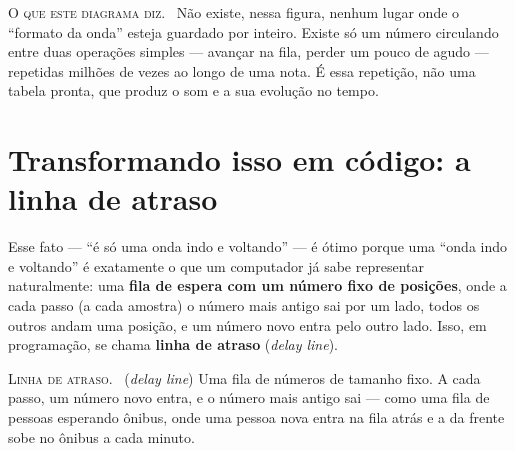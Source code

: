 \documentclass[11pt,oneside]{book}
\newcommand{\nova}[1]{\textsc{\color{accent}#1.}~}
\begin{document}
\begin{center}
\end{center}

\begin{newword}
\nova{O que este diagrama diz} Não existe, nessa figura, nenhum lugar onde
o \enquote{formato da onda} esteja guardado por inteiro. Existe só um
número circulando entre duas operações simples --- avançar na fila,
perder um pouco de agudo --- repetidas milhões de vezes ao longo de uma
nota. É essa repetição, não uma tabela pronta, que produz o som e a sua
evolução no tempo.
\end{newword}

\section*{Transformando isso em código: a linha de atraso}

Esse fato --- \enquote{é só uma onda indo e voltando} --- é ótimo porque
uma \enquote{onda indo e voltando} é exatamente o que um computador já sabe
representar naturalmente: uma \textbf{fila de espera com um número fixo de
posições}, onde a cada passo (a cada amostra) o número mais antigo sai por
um lado, todos os outros andam uma posição, e um número novo entra pelo
outro lado. Isso, em programação, se chama \textbf{linha de atraso}
(\emph{delay line}).

\begin{newword}
\nova{Linha de atraso} (\emph{delay line}) Uma fila de números de tamanho
fixo. A cada passo, um número novo entra, e o número mais antigo sai ---
como uma fila de pessoas esperando ônibus, onde uma pessoa nova entra na
fila atrás e a da frente sobe no ônibus a cada minuto.
\end{newword}
\end{document}
